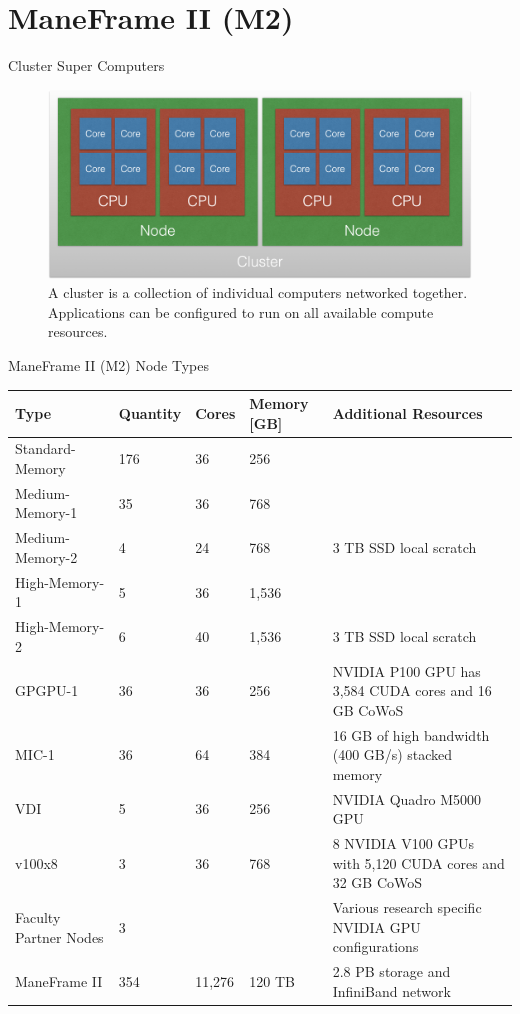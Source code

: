 \section{ManeFrame II (M2)}

\begin{frame}{Cluster Super Computers}
\begin{figure}
  \centering
  \includegraphics[width=0.75\linewidth]{figures/cluster.png}
  \caption{A cluster is a collection of individual computers networked together. Applications can be configured to run on all available compute resources.}
\end{figure}
\end{frame}

\begin{frame}{ManeFrame II (M2) Node Types}
\begin{table}
\tiny
\begin{tabular}{lllll}
\toprule
Type & Quantity & Cores & Memory [GB] & Additional Resources\\
\midrule
Standard-Memory & 176 & 36 & 256 & \\
Medium-Memory-1 & 35 & 36 & 768 & \\
Medium-Memory-2 & 4 & 24 & 768 & 3 TB SSD local scratch\\
High-Memory-1 & 5 & 36 & 1,536 & \\
High-Memory-2 & 6 & 40 & 1,536 & 3 TB SSD local scratch\\
GPGPU-1 & 36 & 36 & 256 & NVIDIA P100 GPU has 3,584 CUDA cores and 16 GB CoWoS\\
MIC-1 & 36 & 64 & 384 & 16 GB of high bandwidth (400 GB/s) stacked memory\\
VDI & 5 & 36 & 256 & NVIDIA Quadro M5000 GPU\\
v100x8 & 3 & 36 & 768 & 8 NVIDIA V100 GPUs with 5,120 CUDA cores and 32 GB CoWoS\\
Faculty Partner Nodes & 3 &  &  & Various research specific NVIDIA GPU configurations\\
\midrule
ManeFrame II & 354 & 11,276 & 120 TB & 2.8 PB storage and InfiniBand network\\
\bottomrule
\end{tabular}
\end{table}
\end{frame}

